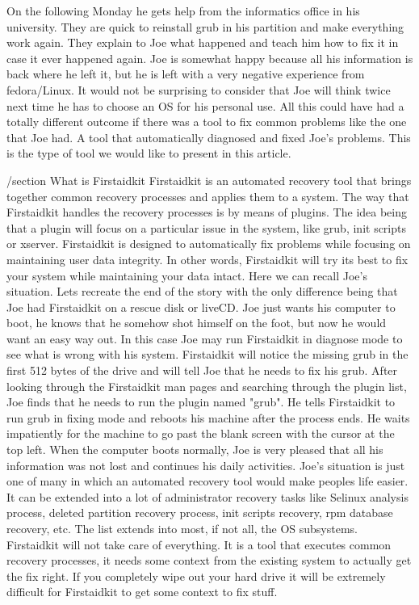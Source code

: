 On the following Monday he gets help from the informatics office in his university.  They are quick to reinstall grub in his partition and make everything work again.  They explain to Joe what happened and teach him how to fix it in case it ever happened again.  Joe is somewhat happy because all his information is back where he left it, but he is left with a very negative experience from fedora/Linux.  It would not be surprising to consider that Joe will think twice next time he has to choose an OS for his personal use.  All this could have had a totally different outcome if there was a tool to fix common problems like the one that Joe had.  A tool that automatically diagnosed and fixed Joe's problems.  This is the type of tool we would like to present in this article.

/section{ What is Firstaidkit }
Firstaidkit is an automated recovery tool that brings together common recovery processes and applies them to a system.  The way that Firstaidkit handles the recovery processes is by means of plugins.  The idea being that a plugin will focus on a particular issue in the system, like grub, init scripts or xserver.  Firstaidkit is designed to automatically fix problems while focusing on maintaining user data integrity.  In other words, Firstaidkit will try its best to fix your system while maintaining your data intact.
Here we can recall Joe's situation.  Lets recreate the end of the story with the only difference being that Joe had Firstaidkit on a rescue disk or liveCD.  Joe just wants his computer to boot, he knows that he somehow shot himself on the foot, but now he would want an easy way out.  In this case Joe may run Firstaidkit in diagnose mode to see what is wrong with his system.  Firstaidkit will notice the missing grub in the first 512 bytes of the drive and will tell Joe that he needs to fix his grub.  After looking through the Firstaidkit man pages and searching through the plugin list, Joe finds that he needs to run the plugin named "grub".  He tells Firstaidkit to run grub in fixing mode and reboots his machine after the process ends.  He waits impatiently for the machine to go past the blank screen with the cursor at the top left.  When the computer boots normally, Joe is very pleased that all his information was not lost and continues his daily activities.
Joe's situation is just one of many in which an automated recovery tool would make peoples life easier.  It can be extended into a lot of administrator recovery tasks like Selinux analysis process, deleted partition recovery process, init scripts recovery, rpm database recovery, etc.  The list extends into most, if not all, the OS subsystems.
Firstaidkit will not take care of everything.  It is a tool that executes common recovery processes, it needs some context from the existing system to actually get the fix right.  If you completely wipe out your hard drive it will be extremely difficult for Firstaidkit to get some context to fix stuff.

